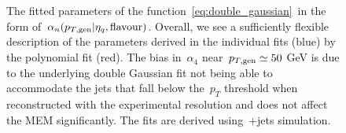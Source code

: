 \begin{figure}
\begin{centering}
 \\
 \\
\caption[The dependence of the transfer function fit parameters on jet kinematics]{The fitted parameters of the function~\cref{eq:double_gaussian}~in the form of~$\alpha_n(p_{T,\mathrm{gen}}|\eta_{q},\mathrm{flavour})$. Overall, we see a sufficiently flexible description of the parameters derived in the individual fits (blue) by the polynomial fit (red). The bias in~$\alpha_4$ near~$p_{T,\mathrm{gen}} \simeq 50$ GeV is due to the underlying double Gaussian fit not being able to accommodate the jets that fall below the~$p_T$ threshold when reconstructed with the experimental resolution and does not affect the MEM significantly. The fits are derived using~\ttbar+jets simulation.}
\label{fig:transfer_acrossbin}
\end{centering}
\end{figure}

